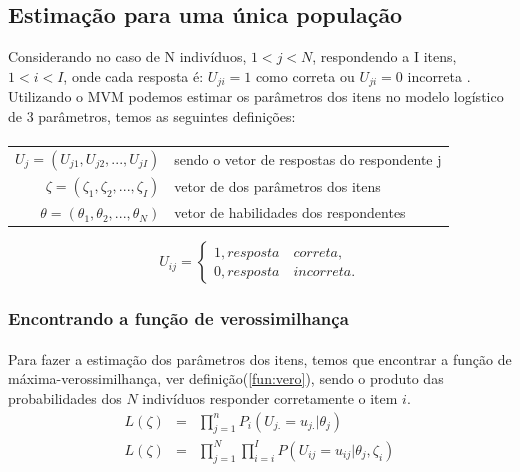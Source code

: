 	\subsection{Estimação para uma única população}
    	Considerando no caso de N indivíduos, $1 < j < N$, respondendo a I itens, $1 < i < I$, onde cada resposta é: $U_{ji} = 1$ como correta ou $U_{ji} = 0$ incorreta \cite{George} . Utilizando o MVM podemos estimar os parâmetros dos itens no modelo logístico de 3 parâmetros, temos as seguintes definições:
	\paragraph{}
	\begin{table}[!h]
	    \centering
    	\begin{tabular}{rl}
    	    $U_j = (U_{j1},U_{j2},...,U_{jI})$ & sendo o vetor de respostas do respondente j\\ 
        	$\zeta = (\zeta_1,\zeta_2,...,\zeta_I)$ & vetor de dos parâmetros dos itens\\
    	    $\theta = (\theta_1,\theta_2,...,\theta_N)$ & vetor de habilidades dos respondentes
    	\end{tabular}
	\end{table}
  
	$$
	U_{ij} = \left\{
	\begin{array}{ll}
    	1, resposta \quad correta,\\
    	0, resposta \quad incorreta.
    	
    	\end{array}\right.
	$$
	
	\subsubsection{Encontrando a função de verossimilhança}
	\paragraph{}
	    Para fazer a estimação dos parâmetros dos itens, temos que encontrar a função de máxima-verossimilhança, ver definição(\ref{fun:vero}), sendo o produto das probabilidades dos $N$ indivíduos responder corretamente o item $i$.
	\begin{eqnarray}
		L(\zeta) &=& \prod_{j = 1}^{n}P_i(U_{j.} = u_{j.}|\theta_j)\\
		L(\zeta) &=& \prod_{j=1}^{N}\prod_{i = i}^{I}P(U_{ij} = u_{ij}|\theta_j,\zeta_i)
	\end{eqnarray}
	

